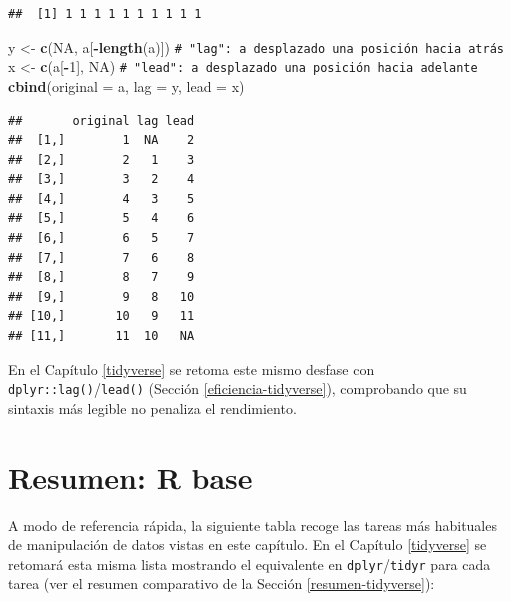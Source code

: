 \documentclass[
]{book}
\newenvironment{Shaded}{\begin{snugshade}}{\end{snugshade}}
\newcommand{\AttributeTok}[1]{\textcolor[rgb]{0.13,0.29,0.53}{#1}}
\newcommand{\CommentTok}[1]{\textcolor[rgb]{0.56,0.35,0.01}{\textit{#1}}}
\newcommand{\ConstantTok}[1]{\textcolor[rgb]{0.56,0.35,0.01}{#1}}
\newcommand{\DecValTok}[1]{\textcolor[rgb]{0.00,0.00,0.81}{#1}}
\newcommand{\FunctionTok}[1]{\textcolor[rgb]{0.13,0.29,0.53}{\textbf{#1}}}
\newcommand{\NormalTok}[1]{#1}
\newcommand{\OtherTok}[1]{\textcolor[rgb]{0.56,0.35,0.01}{#1}}
\newcommand{\SpecialCharTok}[1]{\textcolor[rgb]{0.81,0.36,0.00}{\textbf{#1}}}
\theoremstyle{break}
\theoremstyle{nonumberplain}
\renewcommand{\CommentTok}[1]{\textcolor[rgb]{0.41,0.41,0.41}{\texttt{#1}}}
\begin{document}
\begin{verbatim}
##  [1] 1 1 1 1 1 1 1 1 1 1
\end{verbatim}

\begin{Shaded}
\begin{Highlighting}[]
\NormalTok{y }\OtherTok{\textless{}{-}} \FunctionTok{c}\NormalTok{(}\ConstantTok{NA}\NormalTok{, a[}\SpecialCharTok{{-}}\FunctionTok{length}\NormalTok{(a)])  }\CommentTok{\# "lag": a desplazado una posición hacia atrás}
\NormalTok{x }\OtherTok{\textless{}{-}} \FunctionTok{c}\NormalTok{(a[}\SpecialCharTok{{-}}\DecValTok{1}\NormalTok{], }\ConstantTok{NA}\NormalTok{)          }\CommentTok{\# "lead": a desplazado una posición hacia adelante}
\FunctionTok{cbind}\NormalTok{(}\AttributeTok{original =}\NormalTok{ a, }\AttributeTok{lag =}\NormalTok{ y, }\AttributeTok{lead =}\NormalTok{ x)}
\end{Highlighting}
\end{Shaded}

\begin{verbatim}
##       original lag lead
##  [1,]        1  NA    2
##  [2,]        2   1    3
##  [3,]        3   2    4
##  [4,]        4   3    5
##  [5,]        5   4    6
##  [6,]        6   5    7
##  [7,]        7   6    8
##  [8,]        8   7    9
##  [9,]        9   8   10
## [10,]       10   9   11
## [11,]       11  10   NA
\end{verbatim}

En el Capítulo \ref{tidyverse} se retoma este mismo desfase con \texttt{dplyr::lag()}/\texttt{lead()} (Sección \ref{eficiencia-tidyverse}), comprobando que su sintaxis más legible no penaliza el rendimiento.

\section{Resumen: R base}\label{resumen-manipR}

A modo de referencia rápida, la siguiente tabla recoge las tareas más
habituales de manipulación de datos vistas en este capítulo. En el
Capítulo \ref{tidyverse} se retomará esta misma lista mostrando el
equivalente en \texttt{dplyr}/\texttt{tidyr} para cada tarea (ver el resumen
comparativo de la Sección \ref{resumen-tidyverse}):
\end{document}
